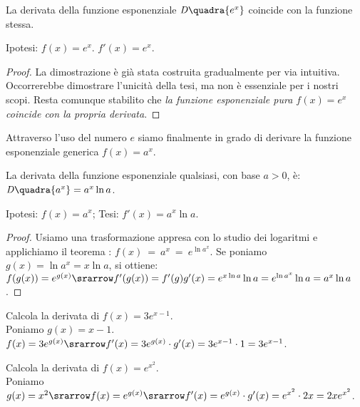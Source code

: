 \begin{teorema}
 La derivata della funzione esponenziale $\mathit{D}\quadra{e^x}$ coincide 
con la funzione stessa.
\end{teorema}
\noindent Ipotesi: $f(x)=e^x$. \tab $f'(x)=e^x$.
\begin{proof}
 La dimostrazione è già stata costruita gradualmente per via intuitiva. 
 Occorrerebbe dimostrare l'unicità della tesi, ma non è essenziale
 per i nostri scopi. Resta comunque stabilito che  \emph{la funzione
 esponenziale pura $f(x)=e^x$ coincide con la propria derivata}.
\end{proof}
Attraverso l'uso del numero \(e\) siamo finalmente in grado di derivare la 
funzione esponenziale generica \(f(x)=a^x\).

\begin{teorema}
  La derivata della funzione esponenziale qualsiasi, con base $a>0$, è: 
$\mathit{D}\quadra{a^x}=
  a^x\ln{a}$.
\end{teorema}
\noindent Ipotesi: $f(x)=a^x$; \tab Tesi: $f'(x)=a^x\ln{a}$.
\begin{proof}
 Usiamo una trasformazione appresa con lo studio dei logaritmi e applichiamo 
 il teorema \pageref{teo:diff01_dericomp}:
 $f(x)~=~a^x~=~e^{\ln a^x}$. Se poniamo $g(x)=\ln a^x=x\ln a$, si ottiene:\\
 $f(g(x))=e^{g(x)}\srarrow f'(g(x))=f'(g)g'(x)= e^{x\ln a}\ln a=
 e^{\ln a^x}\ln a=a^x\ln a$.
\end{proof}
\begin{esempio}
  Calcola la derivata di $f(x)=3e^{x-1}$.\\
  Poniamo $g(x)=x-1$. $f(x)=3e^{g(x)}\srarrow f'(x)=3e^{g(x)}\cdot g'(x)=
  3e^{x-1}\cdot 1=3e^{x-1}$.
\end{esempio}
\begin{esempio}
  Calcola la derivata di $f(x)=e^{x^2}$.\\
  Poniamo $g(x)=x^2\srarrow f(x)=e^{g(x)}\srarrow f'(x)=e^{g(x)}\cdot g'(x)=
  e^{x^2}\cdot 2x=2xe^{x^2}$.
\end{esempio}



